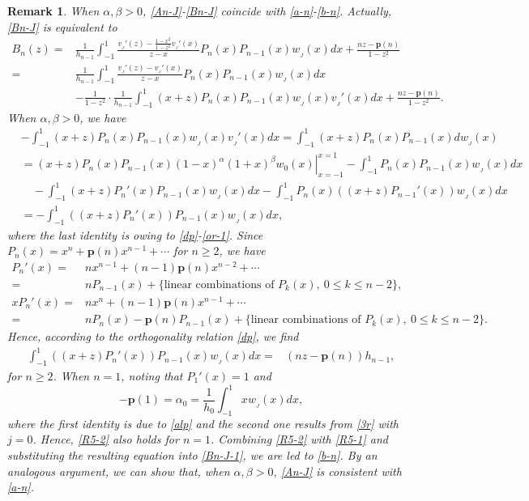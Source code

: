 \documentclass[12pt,a4paper]{article}    %
\newtheorem{remark}{Remark}
\numberwithin{equation}{section}
\begin{document}
\begin{remark}\label{re-J-1}
When $\alpha,\beta>0$, \eqref{An-J}-\eqref{Bn-J} coincide with \eqref{a-n}-\eqref{b-n}. Actually, \eqref{Bn-J} is equivalent to
\begin{align}
 B_n(z)=&\frac{1}{h_{n-1}}\int_{-1}^{1}\frac{v_{_J}'(z)-\frac{1-x^2}{1-z^2}v_{_J}'(x)}{z-x}P_n(x)P_{n-1}(x)w_{_J}(x)dx+\frac{nz-\mathbf{p}(n)}{1-z^2}\nonumber\\
 =&\frac{1}{h_{n-1}}\int_{-1}^{1}\frac{v_{_J}'(z)-v_{_J}'(x)}{z-x}P_n(x)P_{n-1}(x)w_{_J}(x)dx\nonumber\\
 &-\frac{1}{1-z^2}\cdot\frac{1}{h_{n-1}}\int_{-1}^{1}(x+z)P_n(x)P_{n-1}(x)w_{_J}(x)v_{_J}'(x)dx+\frac{nz-\mathbf{p}(n)}{1-z^2}.	 \label{Bn-J-1}	
 \end{align}
When $\alpha,\beta>0$, we have
\begin{align}
&-\int_{-1}^{1}(x+z)P_n(x)P_{n-1}(x)w_{_J}(x)v_{_J}'(x)dx=\int_{-1}^{1}(x+z)P_n(x)P_{n-1}(x)dw_{_J}(x)\nonumber\\		 &=\left.(x+z)P_n(x)P_{n-1}(x)(1-x)^{\alpha}(1+x)^{\beta}w_0(x)\right|_{x=-1}^{x=1}-\int_{-1}^{1}P_n(x)P_{n-1}(x)w_{_J}(x)dx\nonumber\\
&\quad-\int_{-1}^{1}(x+z)P_n'(x)P_{n-1}(x)w_{_J}(x)dx
-\int_{-1}^{1}P_n(x)\left((x+z) P_{n-1}'(x)\right)w_{_J}(x)dx\nonumber\\
&=-\int_{-1}^{1}\left((x+z)P_n'(x)\right)P_{n-1}(x)w_{_J}(x)dx,\label{R5-1}
\end{align}
where the last identity is owing to \eqref{dp}-\eqref{or-1}.
Since $P_n(x)=x^n+\mathbf{p}(n)x^{n-1}+\cdots$ for $n\geq2$, we have
\vspace{-2mm}
\begin{align*}
P_n'(x)=&nx^{n-1}+(n-1)\mathbf{p}(n)x^{n-2}+\cdots\\
=&nP_{n-1}(x)+\{\text{linear combinations of } P_k(x),~0\leq k\leq n-2\},\\
xP_n'(x)=&nx^{n}+(n-1)\mathbf{p}(n)x^{n-1}+\cdots\\
=&nP_{n}(x)-\mathbf{p}(n)P_{n-1}(x)+\{\text{linear combinations of } P_k(x),~0\leq k\leq n-2\}.
\end{align*}
Hence, according to the orthogonality relation \eqref{dp}, we find
\begin{align}\label{R5-2}
\int_{-1}^{1}\left((x+z)P_n'(x)\right)P_{n-1}(x)w_{_J}(x)dx=&\left(nz-\mathbf{p}(n)\right)h_{n-1},
\end{align}
for $n\geq2$. When $n=1$, noting that $P_1'(x)=1$ and
\[-\mathbf{p}(1)=\alpha_0=\frac{1}{h_0}\int_{-1}^1xw_{_J}(x)dx,\]
where the first identity is due to \eqref{alp} and the second one results from \eqref{3r} with $j=0$. Hence, \eqref{R5-2} also holds for $n=1$.
Combining \eqref{R5-2} with \eqref{R5-1} and substituting the resulting equation into
\eqref{Bn-J-1}, we are led to \eqref{b-n}. By an analogous argument, we can show that, when $\alpha,\beta>0$, \eqref{An-J} is consistent with \eqref{a-n}.	
\end{remark}
\end{document}
